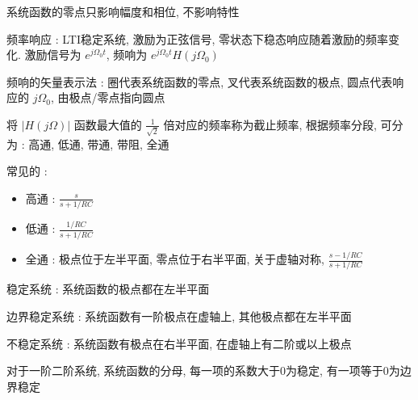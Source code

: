 \documentclass[UTF8, 12pt]{ctexart}
\begin{document}
	系统函数的零点只影响幅度和相位, 不影响特性

	频率响应 : LTI稳定系统, 激励为正弦信号, 零状态下稳态响应随着激励的频率变化. 激励信号为 $ e^{j\Omega_{0}t} $, 频响为 $ e^{j\Omega_{0}t}H(j\Omega_{0}) $ 

	频响的矢量表示法 : 圈代表系统函数的零点, 叉代表系统函数的极点, 圆点代表响应的 $ j\Omega_{0} $, 由极点/零点指向圆点

	将 $ |H(j\Omega)| $ 函数最大值的 $ \frac{1}{\sqrt{2}} $ 倍对应的频率称为截止频率, 根据频率分段, 可分为 : 高通, 低通, 带通, 带阻, 全通

	常见的 :
	\begin{itemize}[leftmargin = 4em]
		\item 高通 : $ \frac{s}{s+1/RC} $
		\item 低通 : $ \frac{1/RC}{s+1/RC} $ 
		\item 全通 : 极点位于左半平面, 零点位于右半平面, 关于虚轴对称, $ \frac{s-1/RC}{s+1/RC} $
	\end{itemize}

	稳定系统 : 系统函数的极点都在左半平面

	边界稳定系统 : 系统函数有一阶极点在虚轴上, 其他极点都在左半平面

	不稳定系统 : 系统函数有极点在右半平面, 在虚轴上有二阶或以上极点
	
	对于一阶二阶系统, 系统函数的分母, 每一项的系数大于0为稳定, 有一项等于0为边界稳定
\end{document}
